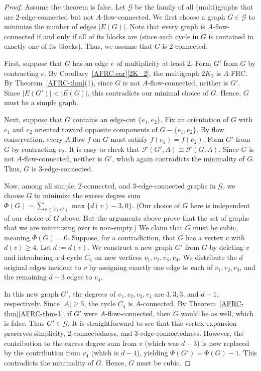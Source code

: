 \documentclass[a4paper,12pt]{article}
\theoremstyle{plain}
\theoremstyle{definition}
\renewcommand\ge\geqslant
\begin{document}
\begin{proof}
    Assume the theorem is false. Let $\mathcal{G}$ 
    be the family of all 
    (multi)graphs that are
    2-edge-connected 
    but not $A$-flow-connected. We first choose a graph $G \in \mathcal{G}$ to minimize the number of edges $|E(G)|$. 
    Note that every graph is $A$-flow-connected if and only if all of its blocks are (since each cycle in $G$ is contained in exactly one of its blocks). Thus, we assume that $G$ is 2-connected. 
    
    First, suppose that $G$ has an edge $e$ of multiplicity at least 2. Form $G'$ from $G$ by contracting $e$. By Corollary~\ref{AFRC-cor}\ref{2K_2}, the multigraph $2K_2$ is $A$-FRC. By Theorem~\ref{AFRC-thm}(1), since $G$ is not $A$-flow-connected, neither is $G'$. Since $|E(G')|<|E(G)|$, this contradicts our minimal choice of $G$. Hence, $G$ must be a simple graph.

    Next, suppose that $G$ contains an edge-cut $\{e_1,e_2\}$. Fix an orientation of $G$ with $e_1$ and $e_2$ oriented toward opposite components of $G-\{e_1,e_2\}$. By flow conservation, every $A$-flow $f$ on $G$ must satisfy $f(e_1)=f(e_2)$. Form $G'$ from $G$ by contracting $e_2$. It is easy to check that $\mathcal{F}(G',A)\cong \mathcal{F}(G,A)$. Since $G$ is not $A$-flow-connected, neither is $G'$, which again contradicts the minimality of $G$. Thus, $G$ is 3-edge-connected.  

    Now, among all simple, 2-connected, and 3-edge-connected graphs in $\mathcal{G}$, we choose $G$ to minimize the excess degree sum $\Phi(G) = \sum_{v\in V(G)}\max\{d(v)-3, 0\}$. 
    (Our choice of $G$ here is independent of our choice of $G$ above.  But the arguments above prove that the set of graphs that we are minimizing over is non-empty.)
    We claim that $G$ must be cubic, meaning $\Phi(G) = 0$. Suppose, for a contradiction, that $G$ has a vertex $v$ with $d(v) \ge 4$. Let $d:=d(v)$.  We construct a new graph $G'$ from $G$ by deleting $v$ and introducing a 4-cycle $C_4$ on new vertices $v_1, v_2, v_3, v_4$. We distribute the $d$ original edges incident to $v$ by assigning exactly one edge to each of $v_1, v_2, v_3$, and the remaining $d-3$ edges to $v_4$. 

In this new graph $G'$, the degrees of $v_1, v_2, v_3, v_4$ are $3, 3, 3$, and $d-1$, respectively. Since $|A| \ge 5$, the cycle $C_4$ is $A$-connected. By Theorem~\ref{AFRC-thm}\ref{AFRC-thm-1}, if $G'$ were $A$-flow-connected, then $G$ would be as well, which is false. Thus $G' \in \mathcal{G}$. It is straightforward to see that this vertex expansion preserves simplicity, 2-connectedness, and 3-edge-connectedness. However, the contribution to the excess degree sum from $v$ (which was $d-3$) is now replaced by the contribution from $v_4$ (which is $d-4$), yielding $\Phi(G') = \Phi(G) - 1$. This contradicts the minimality of $G$. Hence, $G$ must be cubic.
\end{proof}
\end{document}
